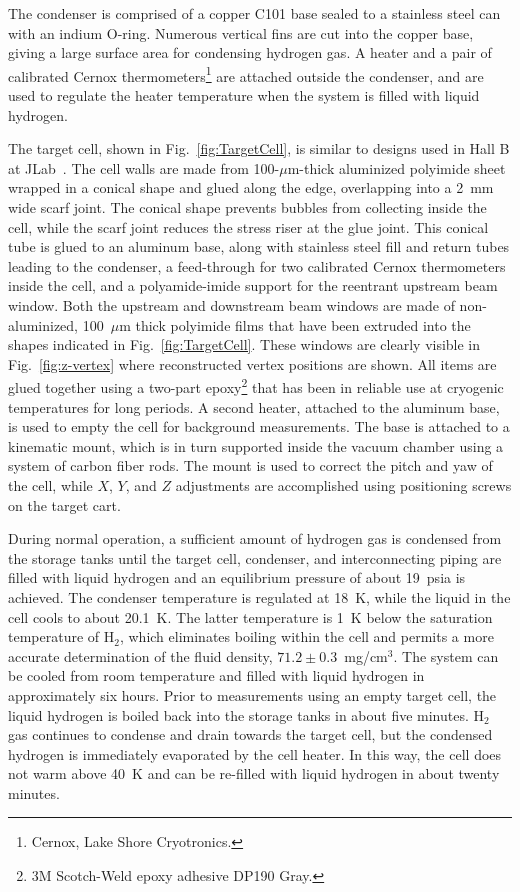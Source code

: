 The condenser is comprised of a copper C101 base
sealed to a stainless steel can with an indium O-ring.  Numerous vertical 
fins are cut into the copper base, giving a large surface area for condensing hydrogen gas.
A heater and a pair of calibrated Cernox thermometers\footnote{Cernox, Lake Shore Cryotronics.}
are attached outside the condenser, and are used to regulate the heater temperature when the
system is filled with liquid hydrogen.

The target cell, shown in Fig.~\ref{fig:TargetCell}, is similar to
designs used in Hall B at JLab~\cite{HAKOBYAN2008218}.  
The cell walls are made from 100-$\mu$m-thick aluminized
polyimide sheet wrapped in a conical shape and glued along the edge,
overlapping into a 2~mm wide scarf joint.  
The conical shape prevents bubbles from collecting inside the cell, while the
scarf joint reduces the stress riser at the glue joint.  This conical
tube is glued to an aluminum base, 
along with stainless steel fill and return tubes leading to the condenser, a feed-through for two calibrated Cernox thermometers inside the cell, and a
polyamide-imide support for the reentrant upstream beam window.  
Both the upstream and downstream beam
windows are made of non-aluminized,
100~$\mu$m thick polyimide films that have been extruded into the
shapes indicated in Fig.~\ref{fig:TargetCell}. These windows are clearly
visible in Fig.~\ref{fig:z-vertex} where reconstructed vertex positions are shown. All items are glued together using
a two-part epoxy\footnote{3M Scotch-Weld epoxy adhesive DP190 Gray.}
that has been in reliable use at cryogenic temperatures for long periods. 
A second  heater, attached to the aluminum base,
is used to empty the cell for background measurements.
The base is attached to a kinematic mount, which is in turn
supported inside the vacuum chamber using a system of carbon fiber rods.    
The mount is used to correct the pitch and yaw
of the cell, while $X$, $Y$, and $Z$ adjustments 
are accomplished using positioning screws on the target cart. 


During normal operation, a sufficient amount of hydrogen gas is condensed from the storage tanks
until the target cell, condenser, and interconnecting piping are filled with liquid hydrogen
and an equilibrium pressure of about 19~psia is achieved.  
The condenser temperature is regulated at 18~K, while the
liquid in the cell cools to about 20.1~K. The latter temperature is 1~K below the saturation
temperature of H$_2$, which eliminates boiling within the cell and permits a more
accurate determination of the fluid density, 
$71.2 \pm 0.3$~mg/cm$^3$.  
The system can be cooled from room temperature and filled with liquid hydrogen in
approximately six hours.  Prior to measurements using an empty target cell, the liquid hydrogen is boiled back into the storage tanks in about five minutes.  H$_2$ gas continues to condense and drain towards the target cell, but the condensed hydrogen is immediately 
evaporated by the cell heater.  In this way, the cell does not warm above 40~K and
can be re-filled with liquid hydrogen in about twenty minutes.

